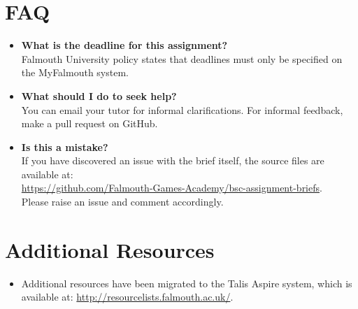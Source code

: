 \documentclass{../../fal_assignment}
\begin{document}
\section*{FAQ}

\begin{itemize}
	\item 	\textbf{What is the deadline for this assignment?} \\ 
    		Falmouth University policy states that deadlines must only be specified on the MyFalmouth system.
    		
	\item 	\textbf{What should I do to seek help?} \\ 
    		You can email your tutor for informal clarifications. For informal feedback, make a pull request on GitHub. 
    		
    	\item 	\textbf{Is this a mistake?} \\ 	
    		If you have discovered an issue with the brief itself, the source files are available at: \\
    		\url{https://github.com/Falmouth-Games-Academy/bsc-assignment-briefs}.\\
    		 Please raise an issue and comment accordingly.
\end{itemize}

\section*{Additional Resources}

\begin{itemize}
    \item Additional resources have been migrated to the Talis Aspire system, which is available at: \url{http://resourcelists.falmouth.ac.uk/}.
\end{itemize}
\end{document}
